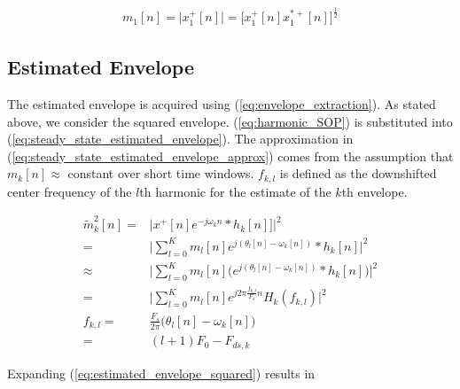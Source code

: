 \documentclass [11pt, proquest,oneside] {ganter_thesis}[2015/03/03]
\begin{document}
\begin{align}
\label{eq:square_root_relationship}
m_1[n] = \Big|x^+_1[n]\Big| = \Big[ x^+_1[n] x^{*+}_1[n] \Big]^\frac{1}{2}
\end{align}

\subsection{Estimated Envelope}

The estimated envelope is acquired using (\ref{eq:envelope_extraction}).  As stated above, we consider the squared envelope.  (\ref{eq:harmonic_SOP}) is substituted into (\ref{eq:steady_state_estimated_envelope}).  The approximation in (\ref{eq:steady_state_estimated_envelope_approx}) comes from the assumption that $m_k[n] \approx$ constant over short time windows.  $f_{k,l}$ is defined as the downshifted center frequency of the $l$th harmonic for the estimate of the $k$th envelope.

\begin{align}
\label{eq:steady_state_estimated_envelope}
\tilde{m}_k^2[n] =& \Big| x^+[n]e^{-j \omega_kn} * h_k[n]]  \Big|^2 \\
%
=& \Bigg|  \sum\limits_{l=0}^K m_l[n]e^{j(\theta_l[n] - \omega_k[n])}*h_k[n] \Bigg|^2 \\
%
\label{eq:steady_state_estimated_envelope_approx}
\approx& \Bigg|  \sum\limits_{l=0}^K m_l[n] \Big(e^{j(\theta_l[n] - \omega_k[n])}*h_k[n] \Big) \Bigg|^2  \\
%
\label{eq:estimated_envelope_squared}
=& \Bigg|  \sum\limits_{l=0}^K m_l[n] e^{j2\pi\frac{f_{k,l}}{F_s}n} H_k(f_{k,l}) \Bigg|^2 \\
%
\label{eq:downshift_radian_frequency}
f_{k,l} =& \frac{F_s}{2\pi}\Big(\theta_l[n] - \omega_k[n]\Big) \nonumber \\
=& (l+1)F_0 - F_{ds,k}
\end{align}

Expanding (\ref{eq:estimated_envelope_squared}) results in
\end{document}
